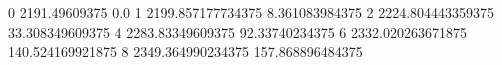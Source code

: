 0 2191.49609375 0.0
1 2199.857177734375 8.361083984375
2 2224.804443359375 33.308349609375
4 2283.83349609375 92.33740234375
6 2332.020263671875 140.524169921875
8 2349.364990234375 157.868896484375
